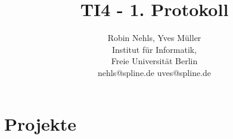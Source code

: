 \documentclass[11pt,a4paper,onecolumn]{report}
\title{TI4 - 1. Protokoll}
\author{Robin Nehls, Yves M\"uller\\
  Institut f\"ur Informatik,\\
  Freie Universit\"at Berlin\\
  nehls@spline.de uves@spline.de }
\date{}
\begin{document}
\maketitle
\tableofcontents

















\chapter{Projekte}
\end{document}
